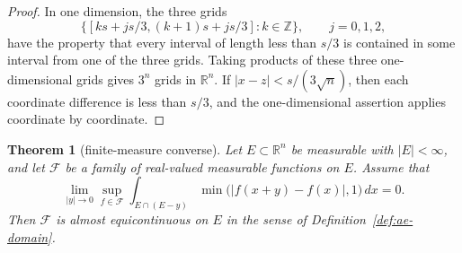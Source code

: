 \documentclass[11pt]{article}
\theoremstyle{plain}
\newtheorem{theorem}{Theorem}
\theoremstyle{definition}
\theoremstyle{remark}
\newcommand{\R}{\mathbb{R}}
\newcommand{\F}{\mathcal{F}}
\newcommand{\meas}[1]{\lvert #1\rvert}
\begin{document}
\begin{proof}
In one dimension, the three grids
\[
    \{[ks+js/3,(k+1)s+js/3]:k\in\mathbb Z\},
    \qquad j=0,1,2,
\]
have the property that every interval of length less than $s/3$ is contained
in some interval from one of the three grids. Taking products of these three
one-dimensional grids gives $3^n$ grids in $\R^n$. If
$|x-z|<s/(3\sqrt n)$, then each coordinate difference is less than $s/3$,
and the one-dimensional assertion applies coordinate by coordinate.
\end{proof}

\begin{theorem}[finite-measure converse]\label{thm:converse}
Let $E\subset\R^n$ be measurable with $\meas{E}<\infty$, and let $\F$ be a
family of real-valued measurable functions on $E$. Assume that
\[
    \lim_{|y|\to0}\sup_{f\in\F}
    \int_{E\cap(E-y)}
    \min\bigl(|f(x+y)-f(x)|,1\bigr)\,dx=0.
\]
Then $\F$ is almost equicontinuous on $E$ in the sense of
Definition~\ref{def:ae-domain}.
\end{theorem}
\end{document}

